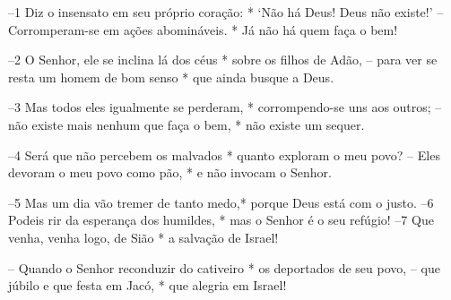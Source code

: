 –1 Diz o insensato em seu próprio coração: * 
‘Não há Deus! Deus não existe!’ 
– Corromperam-se em ações abomináveis. * 
Já não há quem faça o bem! 

–2 O Senhor, ele se inclina lá dos céus * 
sobre os filhos de Adão, 
– para ver se resta um homem de bom senso * 
que ainda busque a Deus. 

–3 Mas todos eles igualmente se perderam, * 
corrompendo-se uns aos outros; 
– não existe mais nenhum que faça o bem, * 
não existe um sequer. 

–4 Será que não percebem os malvados *
quanto exploram o meu povo? 
– Eles devoram o meu povo como pão, * 
e não invocam o Senhor. 

–5 Mas um dia vão tremer de tanto medo,*
porque Deus está com o justo. 
–6 Podeis rir da esperança dos humildes, * 
mas o Senhor é o seu refúgio! 
–7 Que venha, venha logo, de Sião * 
a salvação de Israel! 

– Quando o Senhor reconduzir do cativeiro * 
os deportados de seu povo, 
– que júbilo e que festa em Jacó, * 
que alegria em Israel!